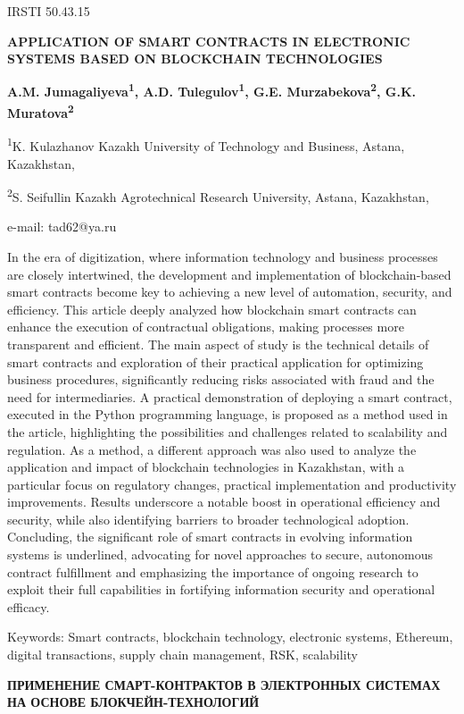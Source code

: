 IRSTI 50.43.15

\textbf{APPLICATION OF SMART CONTRACTS IN ELECTRONIC SYSTEMS BASED ON
BLOCKCHAIN TECHNOLOGIES}

\textbf{A.M. Jumagaliyeva\textsuperscript{1}, A.D.
Tulegulov\textsuperscript{1}, G.E. Murzabekova\textsuperscript{2}, G.K.
Muratova\textsuperscript{2}}

\textsuperscript{1}K. Kulazhanov Kazakh University of Technology and
Business, Astana, Kazakhstan,

\textsuperscript{2}S. Seifullin Kazakh Agrotechnical Research
University, Astana, Kazakhstan,

e-mail: tad62@ya.ru

In the era of digitization, where information technology and business
processes are closely intertwined, the development and implementation of
blockchain-based smart contracts become key to achieving a new level of
automation, security, and efficiency. This article deeply analyzed how
blockchain smart contracts can enhance the execution of contractual
obligations, making processes more transparent and efficient. The main
aspect of study is the technical details of smart contracts and
exploration of their practical application for optimizing business
procedures, significantly reducing risks associated with fraud and the
need for intermediaries. A practical demonstration of deploying a smart
contract, executed in the Python programming language, is proposed as a
method used in the article, highlighting the possibilities and
challenges related to scalability and regulation. As a method, a
different approach was also used to analyze the application and impact
of blockchain technologies in Kazakhstan, with a particular focus on
regulatory changes, practical implementation and productivity
improvements. Results underscore a notable boost in operational
efficiency and security, while also identifying barriers to broader
technological adoption. Concluding, the significant role of smart
contracts in evolving information systems is underlined, advocating for
novel approaches to secure, autonomous contract fulfillment and
emphasizing the importance of ongoing research to exploit their full
capabilities in fortifying information security and operational
efficacy.

Keywords: Smart contracts, blockchain technology, electronic systems,
Ethereum, digital transactions, supply chain management, RSK,
scalability

\textbf{ПРИМЕНЕНИЕ СМАРТ-КОНТРАКТОВ В ЭЛЕКТРОННЫХ СИСТЕМАХ НА ОСНОВЕ
БЛОКЧЕЙН-ТЕХНОЛОГИЙ}

